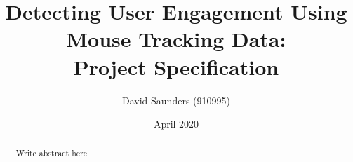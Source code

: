 \documentclass{article}
\title{Detecting User Engagement Using \\ Mouse Tracking Data:\\
    \large Project Specification
}
\author{David Saunders (910995)}
\date{April 2020}
\begin{document}
\maketitle

\begin{abstract} 
    Write abstract here
\end{abstract}

\tableofcontents






% 





\end{document}
